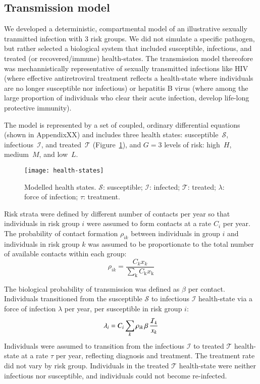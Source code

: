 \subsection{Transmission model}\label{ss:model-sim}						%
We developed a deterministic, compartmental model of an illustrative 
sexually tranmitted infection with 3 risk groups. We did not
simulate a specific pathogen, but rather selected a biological system
that included susceptible, infectious, and treated (or recovered/immune) health-states. 
The transmission model thereofore was mechannistically representative of sexually transmitted infections like
HIV (where effective antiretroviral treatment reflects a health-state where individuals
are no longer susceptible nor infectious) or hepatitis B virus (where among the large proportion
of individuals who clear their acute infection, develop life-long protective immunity). %

The model is represented by a set of coupled, ordinary differential equations (shown in AppendixXX) and
includes three health states:
susceptible~$\mathcal{S}$, infectious~$\mathcal{I}$, and treated~$\mathcal{T}$
(Figure~\ref{fig:health-states}),
and $G = 3$ levels of risk:
high~$H$, medium~$M$, and low~$L$.
\begin{figure}
  \centering
  \texttt{[image: health-states]}
  \caption{Modelled health states.
    $\mathcal{S}$: susceptible;
    $\mathcal{I}$: infected;
    $\mathcal{T}$: treated;
    $\lambda$: force of infection;
    $\tau$: treatment.}
  \label{fig:health-states}
\end{figure}
Risk strata were defined by different number of contacts per year
so that individuals in risk group $i$ were assumed to
form contacts at a rate $C_{i}$ per year.
The probability of contact formation $\rho_{ik}$ between individuals in group $i$
and individuals in risk group $k$ was assumed to be
proportionate to the total number of available contacts within each group:
\begin{equation}
\rho_{ik} = \frac
{C_k x_k}
{\sum_{\mathrm{k}}C_{\mathrm{k}} x_{\mathrm{k}}}
\label{eq:rho}
\end{equation}
\par
The biological probability of transmission was defined as $\beta$ per contact.
Individuals transitioned from the
susceptible $\mathcal{S}$ to infectious $\mathcal{I}$ health-state
via a force of infection $\lambda$ per year, per susceptible in risk group $i$:
\begin{equation}
\lambda_{i} =
C_{i} \sum_k \rho_{ik} \thinspace  \beta \thinspace \frac{\mathcal{I}_k}{x_k}
\label{eq:foi}
\end{equation}
Individuals were assumed to transition from the
infectious $\mathcal{I}$ to treated $\mathcal{T}$ health-state
at a rate $\tau$ per year, reflecting diagnosis and treatment.
The treatment rate did not vary by risk group.
Individuals in the treated $\mathcal{T}$ health-state were neither infectious nor susceptible,
and individuals could not become re-infected.
